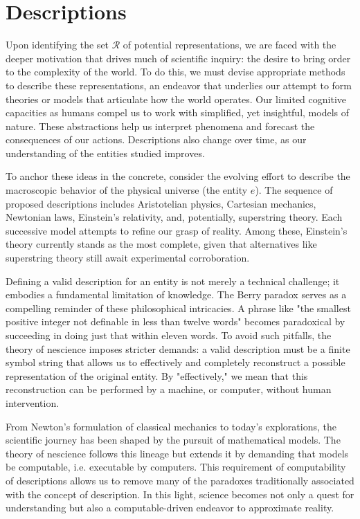 %
%

\section{Descriptions}

Upon identifying the set $\mathcal{R}$ of potential representations, we are faced with the deeper motivation that drives much of scientific inquiry: the desire to bring order to the complexity of the world. To do this, we must devise appropriate methods to describe these representations, an endeavor that underlies our attempt to form theories or models that articulate how the world operates. Our limited cognitive capacities as humans compel us to work with simplified, yet insightful, models of nature. These abstractions help us interpret phenomena and forecast the consequences of our actions. Descriptions also change over time, as our understanding of the entities studied improves.

\begin{example}
To anchor these ideas in the concrete, consider the evolving effort to describe the macroscopic behavior of the physical universe (the entity $e$). The sequence of proposed descriptions includes Aristotelian physics, Cartesian mechanics, Newtonian laws, Einstein's relativity, and, potentially, superstring theory. Each successive model attempts to refine our grasp of reality. Among these, Einstein's theory currently stands as the most complete, given that alternatives like superstring theory still await experimental corroboration.
\end{example}

Defining a valid description for an entity is not merely a technical challenge; it embodies a fundamental limitation of knowledge. The Berry paradox serves as a compelling reminder of these philosophical intricacies. A phrase like "the smallest positive integer not definable in less than twelve words" becomes paradoxical by succeeding in doing just that within eleven words. To avoid such pitfalls, the theory of nescience imposes stricter demands: a valid description must be a finite symbol string that allows us to effectively and completely reconstruct a possible representation of the original entity. By "effectively," we mean that this reconstruction can be performed by a machine, or computer, without human intervention.

From Newton's formulation of classical mechanics to today's explorations, the scientific journey has been shaped by the pursuit of mathematical models. The theory of nescience follows this lineage but extends it by demanding that models be computable, i.e. executable by computers. This requirement of computability of descriptions allows us to remove many of the paradoxes traditionally associated with the concept of description. In this light, science becomes not only a quest for understanding but also a computable-driven endeavor to approximate reality.

